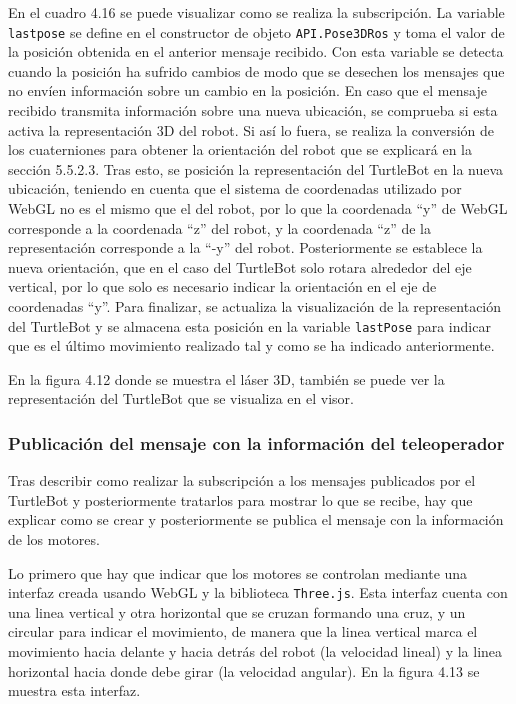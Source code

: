 En el cuadro 4.16 se puede visualizar como se realiza la subscripción. La variable \texttt{lastpose} se define en el constructor de objeto \texttt{API.Pose3DRos} y toma el valor de la posición obtenida en el anterior mensaje recibido. Con esta variable se detecta cuando la posición ha sufrido cambios de modo que se desechen los mensajes que no envíen información sobre un cambio en la posición. En caso que el mensaje recibido transmita información sobre una nueva ubicación, se comprueba si esta activa la representación 3D del robot. Si así lo fuera, se realiza la conversión de los cuaterniones para obtener la orientación del robot que se explicará en la sección 5.5.2.3. Tras esto, se posición la representación del TurtleBot en la nueva ubicación, teniendo en cuenta que el sistema de coordenadas utilizado por WebGL no es el mismo que el del robot, por lo que la coordenada ``y'' de WebGL corresponde a la coordenada ``z'' del robot, y la coordenada ``z'' de la representación corresponde a la ``-y'' del robot. Posteriormente se establece la nueva orientación, que en el caso del TurtleBot solo rotara alrededor del eje vertical, por lo que solo es necesario indicar la orientación en el eje de coordenadas ``y''. Para finalizar, se actualiza la visualización de la representación del TurtleBot y se almacena esta posición en la variable \texttt{lastPose} para indicar que es el último movimiento realizado tal y como se ha indicado anteriormente.

En la figura 4.12 donde se muestra el láser 3D, también se puede ver la representación del TurtleBot que se visualiza en el visor.

\subsubsection{Publicación del mensaje con la información del teleoperador}

Tras describir como realizar la subscripción a los mensajes publicados por el TurtleBot y posteriormente tratarlos para mostrar lo que se recibe, hay que explicar como se crear y posteriormente se publica el mensaje con la información de los motores.

Lo primero que hay que indicar que los motores se controlan mediante una interfaz creada usando WebGL y la biblioteca \texttt{Three.js}. Esta interfaz cuenta con una linea vertical y otra horizontal que se cruzan formando una cruz, y un circular para indicar el movimiento, de manera que la linea vertical marca el movimiento hacia delante y hacia detrás del robot (la velocidad lineal) y la linea horizontal hacia donde debe girar (la velocidad angular). En la figura 4.13 se muestra esta interfaz.

